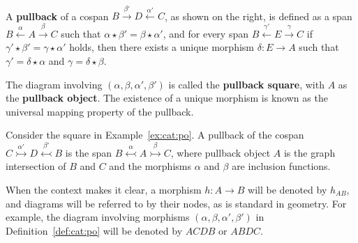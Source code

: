 \begin{definition}
    \label{def:cat:pb}
    \ \newline
\noindent
\begin{minipage}{0.7\textwidth}  
   A \textbf{pullback} of a cospan \(B \overset{\beta'}{\rightarrow} D \overset{\alpha'}{\leftarrow} C \), as shown on the right, is defined as a span \( B \overset{\alpha}{\leftarrow} A \overset{\beta}{\rightarrow} C \) such that \( \alpha \star \beta' = \beta \star \alpha' \), and for every span \( B \overset{\gamma'}{\leftarrow} E \overset{\gamma}{\rightarrow} C \) if \(\gamma' \star \beta' = \gamma \star \alpha'\) holds, then there exists a unique morphism \(\delta: E \to A\) such that $\gamma' = \delta \star \alpha$ and $\gamma = \delta \star \beta$. 
\end{minipage}
\hfill
\begin{minipage}{0.299\textwidth}
    \hfill
{}
\end{minipage}
The diagram involving \( (\alpha, \beta, \alpha', \beta') \) is called the \textbf{pullback square}, with \(A\) as the \textbf{pullback object}. The existence of a unique morphism is known as the universal mapping property of the pullback.
\end{definition} 
 
\begin{definition}
    \label{def:cat:pb}
    Consider the square in Example~\ref{ex:cat:po}. A pullback of the cospan \( C \overset{\alpha'}{\rightarrowtail} D \overset{\beta'}{\leftarrowtail} B \) is the span \( B \overset{\alpha}{\leftarrowtail} A \overset{\beta}{\rightarrowtail} C \), where pullback object \( A \) is the graph intersection of $B$ and $C$ and the morphisms \( \alpha \) and \( \beta \) are inclusion functions.
\end{definition}
\begin{notation}
    When the context makes it clear, a morphism \( h : A \to B \) will be denoted by \( h_{AB} \), and diagrams will be referred to by their nodes, as is standard in geometry. For example, the diagram involving morphisms \( ( \alpha, \beta, \alpha', \beta' ) \) in Definition~\ref{def:cat:po} will be denoted by \( ACDB \) or \( ABDC \).
\end{notation}   